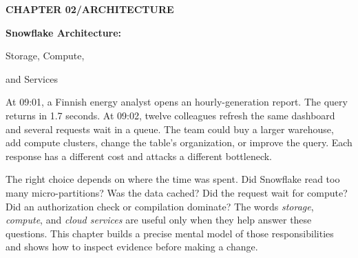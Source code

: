 \documentclass[11pt,twoside]{article}
\begin{document}
{\sffamily\bfseries\color{teal}\fontsize{10}{12}\selectfont CHAPTER 02\quad /\quad ARCHITECTURE}\par\vspace{2mm}
{\sffamily\bfseries\color{navy}\fontsize{23}{26}\selectfont Snowflake Architecture:\par Storage, Compute,\par and Services}\par
\vspace{1.7mm}{\color{steelblue}\rule{\linewidth}{1.5pt}}\par
{}\par\vspace{2mm}

At 09:01, a Finnish energy analyst opens an hourly-generation report. The query returns in 1.7 seconds. At 09:02, twelve colleagues refresh the same dashboard and several requests wait in a queue. The team could buy a larger warehouse, add compute clusters, change the table's organization, or improve the query. Each response has a different cost and attacks a different bottleneck.

The right choice depends on where the time was spent. Did Snowflake read too many micro-partitions? Was the data cached? Did the request wait for compute? Did an authorization check or compilation dominate? The words \emph{storage}, \emph{compute}, and \emph{cloud services} are useful only when they help answer these questions. This chapter builds a precise mental model of those responsibilities and shows how to inspect evidence before making a change.
\end{document}
